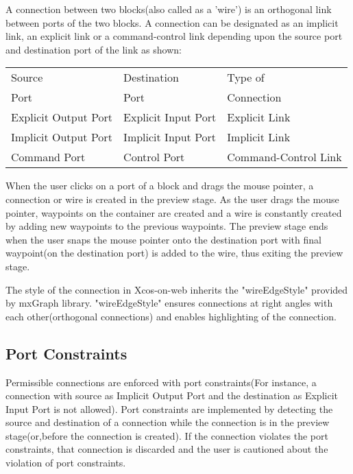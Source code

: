 \documentclass[conference]{IEEEtran}
\begin{document}
A connection between two blocks(also called as a 'wire') is an orthogonal link between ports of the two blocks. A connection can be designated as an implicit link, an explicit link or a command-control link depending upon the source port and destination port of the link as shown:

\begin{center}
\begin{tabu} to 0.4\textwidth { | X[c] | X[c] | X[c] | }
 \hline
 Source & Destination & Type of\\ [0.5ex]
 Port & Port & Connection\\ [0.5ex]
 \hline\hline
 Explicit Output Port & Explicit Input Port & Explicit Link \\
 \hline
 Implicit Output Port & Implicit Input Port & Implicit Link \\
 \hline
 Command Port & Control Port & Command-Control Link  \\
 \hline
\end{tabu}
\end{center}

When the user clicks on a port of a block and drags the mouse pointer, a connection or wire is created in the preview stage. As the user drags the mouse pointer, waypoints on the container are created and a wire is constantly created by adding new waypoints to the previous waypoints.
The preview stage ends when the user snaps the mouse pointer onto the destination port with final waypoint(on the destination port) is added to the wire, thus exiting the preview stage.

The style of the connection in Xcos-on-web inherits the "wireEdgeStyle" provided by mxGraph library. "wireEdgeStyle" ensures connections at right angles with each other(orthogonal connections) and enables highlighting of the connection.

\subsection{Port Constraints}
Permissible connections are enforced with port constraints(For instance, a connection with source as Implicit Output Port and the destination as Explicit Input Port is not allowed). Port constraints are implemented by detecting the source and destination of a connection while the connection is in the preview stage(or,before the connection is created). If the connection violates the port constraints, that connection is discarded and the user is cautioned about the violation of port constraints.
\end{document}
